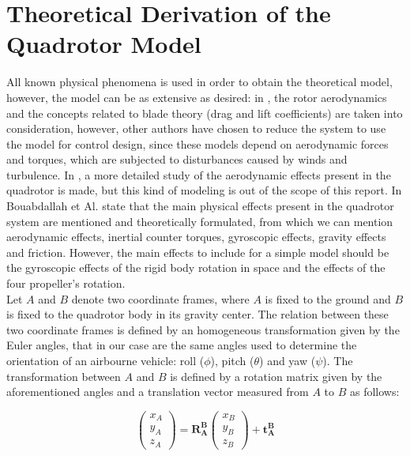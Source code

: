 \section{Theoretical Derivation of the Quadrotor Model}

All known physical phenomena is used in order to obtain the theoretical model, however, the model can be as extensive as desired: in \cite{MahoneyKumarCorke2012}, the rotor aerodynamics and the concepts related to blade theory (drag and lift coefficients) are taken into consideration, however, other authors have chosen to reduce the system to use the model for control design, since these models depend on aerodynamic forces and torques, which are subjected to disturbances caused by winds and turbulence. In \cite{Hoffmann2007}, a more detailed study of the aerodynamic effects present in the quadrotor is made, but this kind of modeling is out of the scope of this report. In \cite{Bouabdallah2004} Bouabdallah et Al. state that the main physical effects present in the quadrotor system are mentioned and theoretically formulated, from which we can mention aerodynamic effects, inertial counter torques, gyroscopic effects, gravity effects and friction. However, the main effects to include for a simple model should be the gyroscopic effects of the rigid body rotation in space and the effects of the four propeller's rotation. \\

Let {$A$} and {$B$} denote two coordinate frames, where {$A$} is fixed to the ground and {$B$} is fixed to the quadrotor body in its gravity center. The relation between these two coordinate frames is defined by an homogeneous transformation given by the Euler angles, that in our case are the same angles used to determine the orientation of an airbourne vehicle: roll ($\phi$), pitch ($\theta$) and yaw ($\psi$). The transformation between {$A$} and {$B$} is defined by a rotation matrix given by the aforementioned angles and a translation vector measured from {$A$} to {$B$} as follows: 

\begin{equation} \label{eq:transformation}
\begin{pmatrix} x_A \\
				y_A \\
				z_A \end{pmatrix} = \mathbf{R_{A}^{B}}\begin{pmatrix} x_B \\
															  y_B \\
															  z_B \end{pmatrix} + \mathbf{t_{A}^{B}} 
\end{equation}

